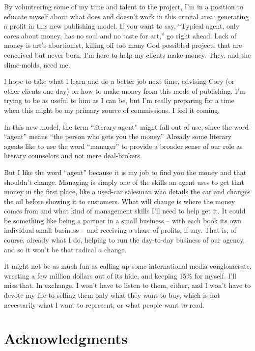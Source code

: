 By volunteering some of my time and talent to the project, I'm in a 
position to educate myself about what does and doesn't work in this 
crucial area: generating a profit in this new publishing model. If you 
want to say, “Typical agent, only cares about money, has no soul and 
no taste for art,” go right ahead. Lack of money is art's 
abortionist, killing off too many God-possibled projects that are 
conceived but never born. I'm here to help my clients make money. They, 
and the slime-molds, need me.

I hope to take what I learn and do a better job next time, advising 
Cory (or other clients one day) on how to make money from this mode of 
publishing. I'm trying to be as useful to him as I can be, but I'm 
really preparing for a time when this might be my primary source of 
commissions. I feel it coming.

In this new model, the term “literary agent” might fall out of use, 
since the word “agent” means “the person who gets you the 
money.” Already some literary agents like to use the word 
“manager” to provide a broader sense of our role as literary 
counselors and not mere deal-brokers.

But I like the word “agent” because it is my job to find you the 
money and that shouldn't change. Managing is simply one of the skills 
an agent uses to get that money in the first place, like a used-car 
salesman who details the car and changes the oil before showing it to 
customers. What will change is where the money comes from and what kind 
of management skills I'll need to help get it. It could be something 
like being a partner in a small business -- with each book its own 
individual small business -- and receiving a share of profits, if any. 
That is, of course, already what I do, helping to run the day-to-day 
business of our agency, and so it won't be that radical a change.

It might not be as much fun as calling up some international media 
conglomerate, wresting a few million dollars out of its hide, and 
keeping 15\% for myself. I'll miss that. In exchange, I won't have to 
listen to them, either, and I won't have to devote my life to selling 
them only what they want to buy, which is not necessarily what I want 
to represent, or what people want to read.

\section{Acknowledgments}

